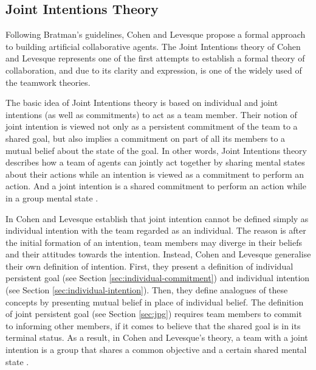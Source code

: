 \documentclass[11pt]{article}
\begin{document}
\subsection{Joint Intentions Theory}
\label{sec:joint-intentions}

Following Bratman's guidelines, Cohen and Levesque propose a formal approach to
building artificial collaborative agents. The Joint Intentions theory of Cohen
and Levesque \cite{cohen:teamwork, cohen:intention-commitment,
cohen:persistence-intention-commitment, cohen:intentions,
levesque:acting-together} represents one of the first attempts to establish a
formal theory of collaboration, and due to its clarity and expression, is one of
the widely used of the teamwork theories. 

The basic idea of Joint Intentions theory is based on individual and joint
intentions (as well as commitments) to act as a team member. Their notion of
joint intention is viewed not only as a persistent commitment of the team to a
shared goal, but also implies a commitment on part of all its members to a
mutual belief about the state of the goal. In other words, Joint Intentions
theory describes how a team of agents can jointly act together by sharing mental
states about their actions while an intention is viewed as a commitment to
perform an action. And a joint intention is a shared commitment to perform an
action while in a group mental state \cite{cohen:intention-commitment}. 

In \cite{cohen:teamwork} Cohen and Levesque establish that joint intention
cannot be defined simply as individual intention with the team regarded as an
individual. The reason is after the initial formation of an intention, team
members may diverge in their beliefs and their attitudes towards the intention.
Instead, Cohen and Levesque generalise their own definition of intention. First,
they present a definition of individual persistent goal (see Section
\ref{sec:individual-commitment}) and individual intention (see Section
\ref{sec:individual-intention}). Then, they define analogues of these concepts
by presenting mutual belief in place of individual belief. The definition of
joint persistent goal (see Section \ref{sec:jpg}) requires team members to
commit to informing other members, if it comes to believe that the shared goal
is in its terminal status. As a result, in Cohen and Levesque's theory, a team
with a joint intention is a group that shares a common objective and a certain
shared mental state \cite{jarvis:teams-multiagent-systems}.
\end{document}
